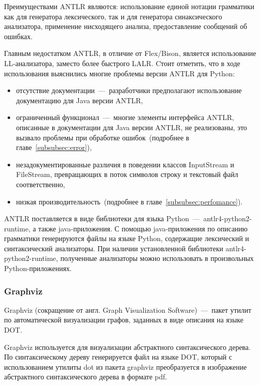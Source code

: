 \documentclass[12pt,a4paper,oneside]{extarticle}
\begin{document}
            Преимуществами ANTLR являются: использование единой нотации грамматики как для генератора лексического, так и для генератора синаксического анализатора, применение нисходящего анализа, предоставление сообщений об ошибках.

            Главным недостатком ANTLR, в отличие от Flex/Bison, является использование LL-анализатора, заместо более быстрого LALR.
            Cтоит отметить, что в ходе использования выяснились многие проблемы версии ANTLR для Python:
            \begin{itemize}
                \item отсутствие документации~---~разработчики предполагают использование документацию для Java версии ANTLR,
                \item ограниченный функционал~---~многие элементы интерфейса ANTLR, описанные в документации для Java версии ANTLR, не реализованы, это вызвало проблемы при обработке ошибок~(подробнее в главе~\ref{subsubsec:error}),
                \item незадокументированные различия в поведении классов InputStream и FileStream, превращающих в поток символов строку и текстовый файл соответственно,
                \item низкая производительность~(подробнее в главе~\ref{subsubsec:perfomance}).
            \end{itemize}

            ANTLR поставляется в виде библиотеки для языка Python~---~antlr4-python2-runtime, а также java-приложения.
            С помощью java-приложения по описанию грамматики генерируются файлы на языке Python, содержащие лексический и синтаксический анализаторы.
            При наличии установленной библиотеки antlr4-python2-runtime, полученные анализаторы можно использовать в произвольных Python-приложениях.            
        \subsubsection{Graphviz}
            Graphviz (сокращение от англ. Graph Visualization Software)~---~пакет утилит по автоматической визуализации графов, заданных в виде описания на языке DOT.

            Graphviz используется для визуализации абстрактного синтаксического дерева.
            По синтаксическому дереву генерируется файл на языке DOT, который с использованием утилиты dot из пакета graphviz преобразуется в изображение абстрактного синтаксического дерева в формате pdf.
    \clearpage
\end{document}
